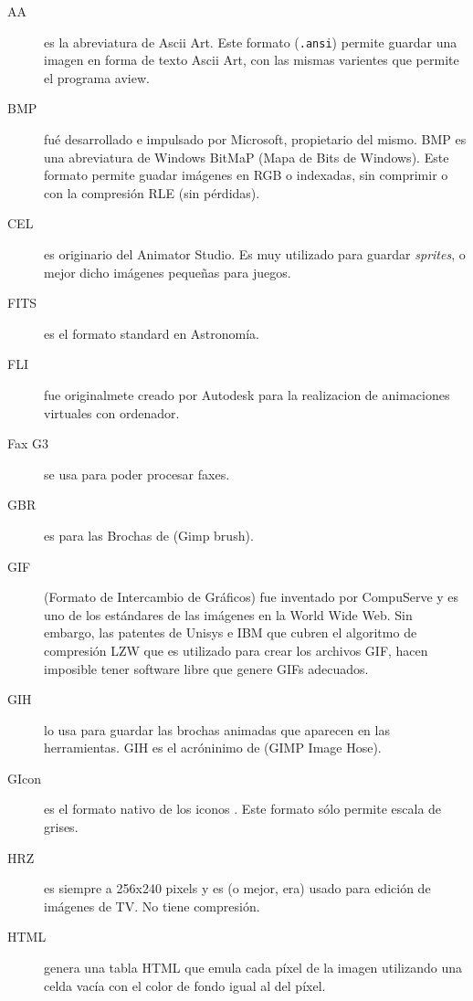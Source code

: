 \begin{description}

\item[AA] es la  abreviatura de Ascii Art. Este  formato ({\tt .ansi})
permite guardar una imagen en forma de texto Ascii Art, con las mismas
varientes que permite el programa {\sf aview}.

\item [BMP]  fué desarrollado  e impulsado por  Microsoft, propietario
del mismo. BMP  es una abreviatura de Windows BitMaP  (Mapa de Bits de
Windows). Este formato permite guadar imágenes en RGB o indexadas, sin
comprimir o con la compresión RLE (sin pérdidas).

\item [CEL] es  originario del Animator Studio. Es  muy utilizado para
guardar {\em sprites}, o mejor dicho imágenes pequeñas para juegos.

\item [FITS] es el formato standard en Astronomía.

\item [FLI] fue  originalmete creado por Autodesk  para la realizacion
de animaciones virtuales con ordenador.

\item [Fax G3] se usa para poder procesar faxes.

\item [GBR] es para las Brochas de \gimp (Gimp brush).

\item [GIF]  (Formato de  Intercambio de  Gráficos) fue  inventado por
CompuServe y es uno de los estándares de las imágenes en la World Wide
Web. Sin embargo, las patentes de Unisys e IBM que cubren el algoritmo
de compresión LZW que es utilizado  para crear los archivos GIF, hacen
imposible tener software libre que genere GIFs adecuados.

\item  [GIH]  lo usa  \gimp  para  guardar  las brochas  animadas  que
aparecen  en las  herramientas. GIH  es el  acróninimo de  (GIMP Image
Hose).

\item [GIcon] es  el formato nativo de los iconos  \gimp. Este formato
sólo permite escala de grises.

\item [HRZ] es siempre a 256x240 pixels y es (o mejor, era) usado para
edición de imágenes de TV. No tiene compresión.

\item [HTML] genera  una tabla HTML que emula cada  píxel de la imagen
utilizando una celda vacía con el color de fondo igual al del píxel.


\end{description}
